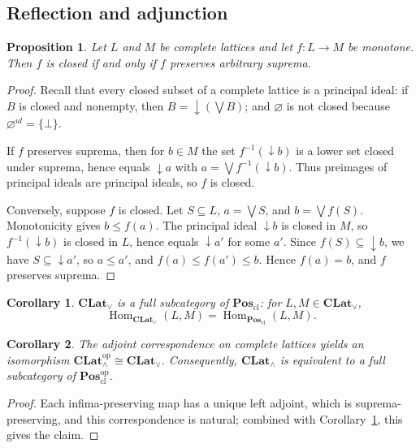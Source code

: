 \documentclass{amsart}
\theoremstyle{plain}
\newtheorem{proposition}{Proposition}[section]
\newtheorem{corollary}{Corollary}[section]
\theoremstyle{definition}
\theoremstyle{remark}
\DeclareMathOperator{\Hom}{Hom}
\begin{document}
\subsection{Reflection and adjunction}\label{subsec:reflection}

\begin{proposition}\label{prop:closed-iff-sup}
Let $L$ and $M$ be complete lattices and let $f\colon L\to M$ be monotone. Then $f$ is closed if and only if $f$ preserves arbitrary suprema.
\end{proposition}

\begin{proof}
Recall that every closed subset of a complete lattice is a principal ideal: if $B$ is closed and nonempty, then $B=\downarrow(\bigvee B)$; and $\varnothing$ is not closed because $\varnothing^{ul}=\{\bot\}$.

If $f$ preserves suprema, then for $b\in M$ the set $f^{-1}(\downarrow b)$ is a lower set closed under suprema, hence equals $\downarrow a$ with $a=\bigvee f^{-1}(\downarrow b)$. Thus preimages of principal ideals are principal ideals, so $f$ is closed.

Conversely, suppose $f$ is closed. Let $S\subseteq L$, $a=\bigvee S$, and $b=\bigvee f(S)$. Monotonicity gives $b\leq f(a)$. The principal ideal $\downarrow b$ is closed in $M$, so $f^{-1}(\downarrow b)$ is closed in $L$, hence equals $\downarrow a'$ for some $a'$. Since $f(S)\subseteq\downarrow b$, we have $S\subseteq\downarrow a'$, so $a\leq a'$, and $f(a)\leq f(a')\leq b$. Hence $f(a)=b$, and $f$ preserves suprema.
\end{proof}

\begin{corollary}\label{cor:CLat-vee-full}
$\mathbf{CLat}_\vee$ is a full subcategory of $\mathbf{Pos}_{\mathrm{cl}}$: for $L,M\in\mathbf{CLat}_\vee$,
 \[\Hom_{\mathbf{CLat}_\vee}(L,M)=\Hom_{\mathbf{Pos}_{\mathrm{cl}}}(L,M).\]
\end{corollary}

\begin{corollary}\label{cor:CLat-wedge-full}
The adjoint correspondence on complete lattices yields an isomorphism $\mathbf{CLat}_\wedge^{\mathrm{op}}\cong\mathbf{CLat}_\vee$. Consequently, $\mathbf{CLat}_\wedge$ is equivalent to a full subcategory of $\mathbf{Pos}_{\mathrm{cl}}^{\mathrm{op}}$.
\end{corollary}

\begin{proof}
Each infima-preserving map has a unique left adjoint, which is suprema-preserving, and this correspondence is natural; combined with Corollary~\ref{cor:CLat-vee-full}, this gives the claim.
\end{proof}
\end{document}
